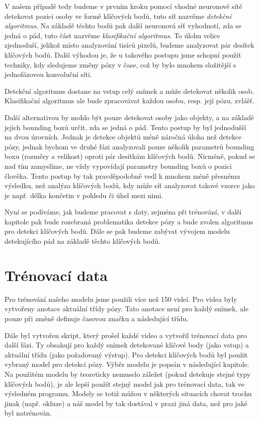 V našem případě tedy budeme v prvním kroku pomocí vhodné neuronové sítě
detekovat pozici osoby ve formě klíčových bodů, tuto síť nazvěme
\textit{detekční algoritmus}. Na základě těchto bodů pak další neuronová síť
vyhodnotí, zda se jedná o pád, tuto část nazvěme \textit{klasifikační
    algoritmus}. To úlohu velice zjednoduší, jelikož místo analyzování tisíců
pixelů, budeme analyzovat pár desítek klíčových bodů. Další výhodou je, že u
takového postupu jsme schopní použít techniky, kdy sledujeme změny pózy v čase,
což by bylo mnohem složitější s jednofázovou konvoluční síti.

Detekční algoritmus dostane na vstup celý snímek a může detekovat několik osob.
Klasifikační algoritmus ale bude zpracovávat každou osobu, resp. její pózu,
zvlášť.

Další alternativou by mohlo být pouze detekovat osoby jako objekty, a na
základě jejich bounding boxů určit, zda se jedná o pád. Tento postup by byl
jednodušší na dvou úrovních. Jednak je detekce objektů méně náročná úloha než
detekce pózy, jednak bychom ve druhé fázi analyzovali pouze několik parametrů
bounding boxu (rozměry a velikost) oproti pár desítkám klíčových bodů. Nicméně,
pokud se nad tím zamyslíme, ne vždy vypovídají parametry bounding boxů o pozici
člověka. Tento postup by tak pravděpodobně vedl k mnohem méně přesnému
výsledku, než analýza klíčových bodů, kdy může síť analyzovat takové vzorce
jako je např. délka končetin v pohledu či úhel mezi nimi.

Nyní se podíváme, jak budeme pracovat s daty, zejména při trénování, v další
kapitole pak bude rozebraná problematika detekce pózy a bude zvolen algoritmus
pro detekci klíčových bodů. Dále se pak budeme zabývat vývojem modelu
detekujícího pád na základě těchto klíčových bodů.

\section{Trénovací data}
\label{sec:TrainingData}

Pro trénování našeho modelu jsme použili více než 150 videí. Pro videa byly
vytvořeny anotace aktuální třídy pózy. Tato anotace není pro každý snímek, ale
pouze při změně definuje časovou značku a následující třídu.

Dále byl vytvořen skript, který prošel každé video a vytvořil trénovací data
pro další fázi. Ty obsahují pro každý snímek detekované klíčové body (jako
vstup) a aktuální třídu (jako požadovaný výstup). Pro detekci klíčových bodů
byl použit vybraný model pro detekci pózy. Výběr modelu je popsán v následující
kapitole. Na použitém modelu by teoreticky nemuselo záležet (pokud detekuje
stejné typy klíčových bodů), je ale lepší použít stejný model jak pro trénovací
data, tak ve výsledném programu. Modely se totiž můžou v některých situacích
chovat trochu jinak (např. okluze) a náš model by tak dostával v praxi jiná
data, než pro jaké byl natrénován.

